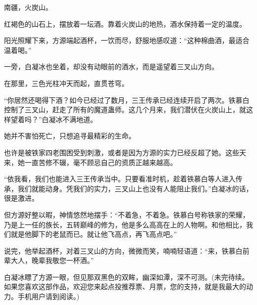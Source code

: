 \begin{this_body}
南疆，火炭山。

红褐色的山石上，摆放着一坛酒。靠着火炭山的地热，酒水保持着一定的温度。

阳光照耀下来，方源端起酒杯，一饮而尽，舒服地感叹道：“这种棉曲酒，最适合温着喝。”

一旁，白凝冰也坐着，却没有动眼前的酒水，而是遥望着三叉山方向。

在那里，三色光柱冲天而起，直贯苍穹。

“你居然还喝得下酒？如今已经过了数月，三王传承已经连续开启了两次。铁慕白控制了三叉山，赶走了所有的魔道蛊师。这几个月来，我们潜伏在火炭山上，就这样望着吗？”白凝冰不满地道。

她并不害怕死亡，只想追寻最精彩的生命。

也许是被铁家四老围困受到刺激，或者是因为方源的实力已经反超了她。这些天来，她一直苦修不辍，毫不顾忌自己的资质正越来越高。

“依我看，我们也能进入三王传承当中。只要看准时机，趁着铁慕白等人进入传承，我们就能动身。凭我们的实力，三叉山上也没有人能阻止我们。”白凝冰的话，很是激进。

但方源好整以暇，神情悠然地摆手：“不着急，不着急。铁慕白号称铁家的荣耀，乃是上一任的族长，五转巅峰的修为，他是多么高高在上的人物啊。和他相比，我们就是他脚下的老鼠而已。就让他飞高点，再飞高点吧。”

说完，他举起酒杯，对着三叉山的方向，微微而笑，喃喃轻语道：“来，铁慕白前辈大人，晚辈我敬您一杯酒。”

白凝冰瞟了方源一眼，但见那双黑色的双眸，幽深如潭，深不可测。(未完待续。如果您喜欢这部作品，欢迎您来起点投推荐票、月票，您的支持，就是我最大的动力。手机用户请到阅读。)

\end{this_body}

